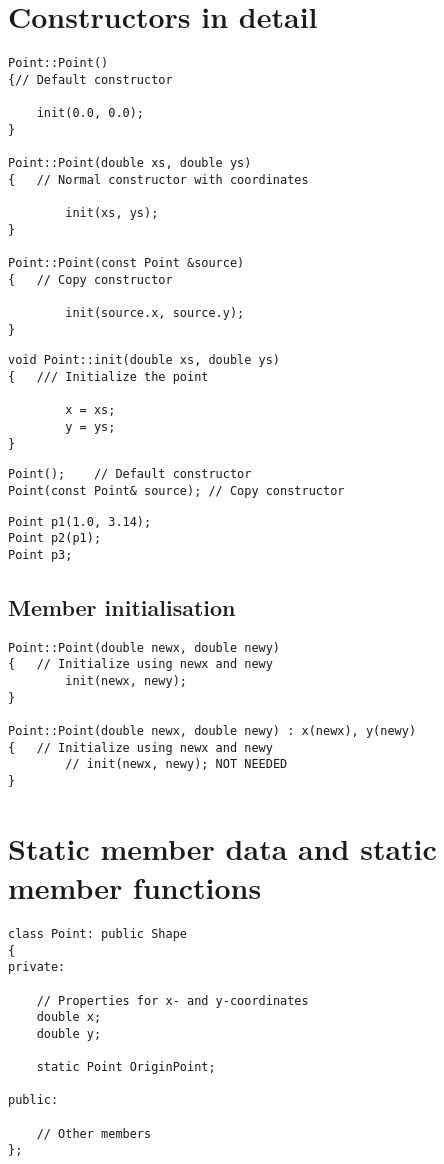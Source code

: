 \section{Constructors in detail}

\begin{lstlisting}
Point::Point()
{// Default constructor

	init(0.0, 0.0);
}

Point::Point(double xs, double ys)
{	// Normal constructor with coordinates

		init(xs, ys);
}

Point::Point(const Point &source)
{	// Copy constructor

		init(source.x, source.y);
}
\end{lstlisting}

\begin{lstlisting}
void Point::init(double xs, double ys)
{	/// Initialize the point

		x = xs;
		y = ys;
}
\end{lstlisting}

\begin{lstlisting}
Point();	// Default constructor
Point(const Point& source);	// Copy constructor
\end{lstlisting}

\begin{lstlisting}
Point p1(1.0, 3.14);
Point p2(p1);
Point p3;
\end{lstlisting}

\subsection{Member initialisation}

\begin{lstlisting}
Point::Point(double newx, double newy)
{	// Initialize using newx and newy
		init(newx, newy);
}

Point::Point(double newx, double newy) : x(newx), y(newy)
{	// Initialize using newx and newy
		// init(newx, newy); NOT NEEDED
}
\end{lstlisting}

\section{Static member data and static member functions}

\begin{lstlisting}
class Point: public Shape
{
private:

	// Properties for x- and y-coordinates
	double x;
	double y;

	static Point OriginPoint;

public:

	// Other members
};
\end{lstlisting}

